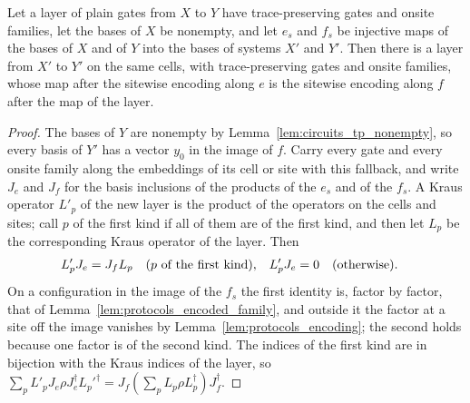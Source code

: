 \begin{theorem}
    \label{thm:protocols_encoded_layer}
    \leanok
    Let a layer of plain gates from $X$ to $Y$ have trace-preserving gates and onsite families,
    let the bases of $X$ be nonempty, and let $e_s$ and $f_s$ be injective maps of the bases of
    $X$ and of $Y$ into the bases of systems $X'$ and $Y'$. Then there is a layer from $X'$ to
    $Y'$ on the same cells, with trace-preserving gates and onsite families, whose map after
    the sitewise encoding along $e$ is the sitewise encoding along $f$ after the map of the
    layer.
\end{theorem}
\begin{proof}\leanok
    The bases of $Y$ are nonempty by Lemma~\ref{lem:circuits_tp_nonempty}, so every basis of
    $Y'$ has a vector $y_0$ in the image of $f$. Carry every gate and every onsite family along
    the embeddings of its cell or site with this fallback, and write $J_e$ and $J_f$ for the
    basis inclusions of the products of the $e_s$ and of the $f_s$. A Kraus operator $L'_p$ of
    the new layer is the product of the operators on the cells and sites; call $p$ of the first
    kind if all of them are of the first kind, and then let $L_p$ be the corresponding Kraus
    operator of the layer. Then
    \begin{align}
        L'_pJ_e&=J_fL_p\quad\text{($p$ of the first kind)}, &
        L'_pJ_e&=0\quad\text{(otherwise)}.
        \notag
    \end{align}
    On a configuration in the image of the $f_s$ the first identity is, factor by factor,
    that of Lemma~\ref{lem:protocols_encoded_family}, and outside it the factor at a site off
    the image vanishes by Lemma~\ref{lem:protocols_encoding}; the second holds because one
    factor is of the second kind. The indices of the first kind are in bijection with the Kraus
    indices of the layer, so
    $\sum_pL'_pJ_e\rho J_e^\dagger L_p'^\dagger=J_f(\sum_pL_p\rho L_p^\dagger)J_f^\dagger$.
\end{proof}

